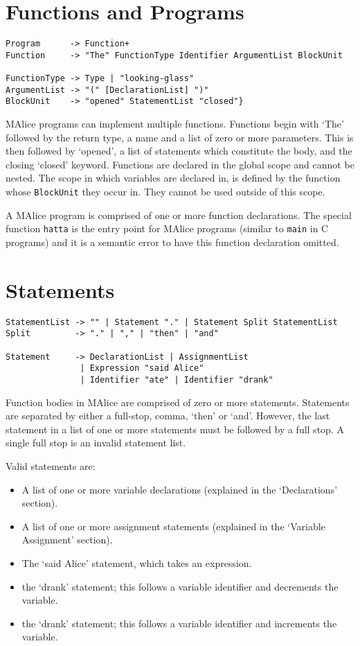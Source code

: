 \documentclass[a4wide, 11pt]{article}
\begin{document}
\section{Functions and Programs}

\begin{verbatim}
Program      -> Function+
Function     -> "The" FunctionType Identifier ArgumentList BlockUnit

FunctionType -> Type | "looking-glass"
ArgumentList -> "(" [DeclarationList] ")"
BlockUnit    -> "opened" StatementList "closed"}
\end{verbatim}

MAlice programs can implement multiple functions. Functions begin with `The' followed by the return type, a name and a list of zero or more parameters. This is then followed by `opened', a list of statements which constitute the body, and the closing `closed' keyword. Functions are declared in the global scope and cannot be nested. The scope in which variables are declared in, is defined by the function whose \texttt{BlockUnit} they occur in. They cannot be used outside of this scope.

A MAlice program is comprised of one or more function declarations. The special function \texttt{hatta} is the entry point for MAlice programs (similar to \texttt{main} in C programs) and it is a semantic error to have this function declaration omitted.

\section{Statements}

\begin{verbatim}
StatementList -> "" | Statement "." | Statement Split StatementList
Split         -> "." | "," | "then" | "and"
               
Statement     -> DeclarationList | AssignmentList
               | Expression "said Alice"
               | Identifier "ate" | Identifier "drank"
\end{verbatim}

Function bodies in MAlice are comprised of zero or more statements. Statements are separated by either a full-stop, comma, `then' or `and'. However, the last statement in a list of one or more statements must be followed by a full stop. A single full stop is an invalid statement list.

Valid statements are:
\begin{itemize}

\item A list of one or more variable declarations (explained in the `Declarations' section).
\item A list of one or more assignment statements (explained in the `Variable Assignment' section).
\item The `said Alice' statement, which takes an expression.
\item the `drank' statement; this follows a variable identifier and decrements the variable.
\item the `drank' statement; this follows a variable identifier and increments the variable.

\end{itemize}
  
\end{document}

